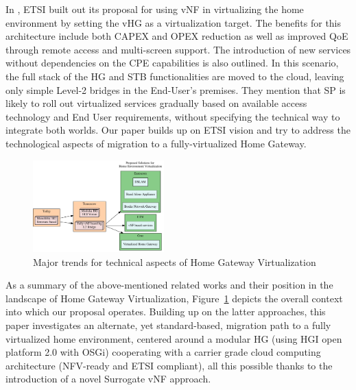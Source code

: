 In \cite{_network_2013}, ETSI built out its proposal for using vNF in virtualizing the home environment by setting the vHG as a virtualization target.
The benefits for this architecture include both CAPEX and OPEX reduction as well as improved QoE through remote access and multi-screen support.
The introduction of new services without dependencies on the CPE capabilities is also outlined.
In this scenario, the full stack of the HG and STB functionalities are moved to the cloud, leaving only simple Level-2 bridges in the End-User's premises.
They mention that SP is likely to roll out virtualized services gradually based on available access technology and End User requirements, without specifying the technical way to integrate both worlds.
Our paper builds up on ETSI vision and try to address the technological aspects of migration to a fully-virtualized Home Gateway.



\begin{figure}
  \begin{center}
    \includegraphics[width=0.45\textwidth]{fig/vhgtrends.pdf}
  \end{center}
  \caption{ Major trends for technical aspects of Home Gateway Virtualization
    \label{fig:trends}
  }
\end{figure}	

As a summary of the above-mentioned related works and their position in the landscape of Home Gateway Virtualization, Figure~\ref{fig:trends} depicts the overall context into which our proposal operates.
Building up on the latter approaches, this paper investigates an alternate, yet standard-based, migration path to a fully virtualized home environment, centered around a modular HG (using HGI open platform 2.0 with OSGi) cooperating with a carrier grade cloud computing architecture (NFV-ready and ETSI compliant), all this possible thanks to the introduction of a novel Surrogate vNF approach.




